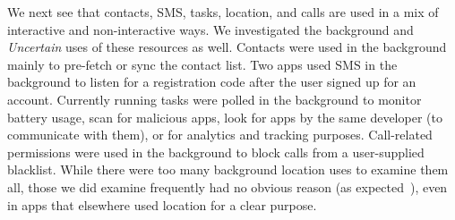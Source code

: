 We next see that contacts, SMS, tasks, location,
and calls are used in a mix of interactive and non-interactive ways.
We investigated the background and
\emph{Uncertain} uses of these resources as well.
Contacts were used in the
background mainly to pre-fetch or sync the contact list. Two
apps used SMS in the background to listen for a registration
code after the user signed up for an account. Currently
running tasks were polled in the background to monitor
battery usage, scan for malicious apps, look for apps by the same
developer (to communicate with them), or for analytics and tracking purposes. 
Call-related permissions were
used in the background to block calls from a user-supplied blacklist.
While there were too many background location uses to examine them all,
those we did examine frequently 
had no obvious reason (as expected~\cite{Fu:2014,Almuhimedi:2015}), even in apps that elsewhere 
used location for a clear purpose.



